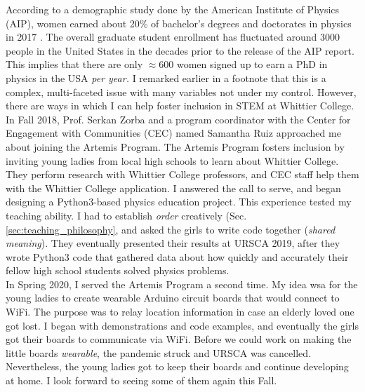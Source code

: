 \documentclass[../../../main.tex]{subfiles}
\begin{document}
According to a demographic study done by the American Institute of Physics (AIP), women earned about 20\% of bachelor's degrees and doctorates in physics in 2017 \cite{aip}.  The overall graduate student enrollment has fluctuated around 3000 people in the United States in the decades prior to the release of the AIP report.  This implies that there are only $\approx 600$ women signed up to earn a PhD in physics in the USA \textit{per year.}  I remarked earlier in a footnote that this is a complex, multi-faceted issue with many variables not under my control.  However, there are ways in which I can help foster inclusion in STEM at Whittier College.
\\
\vspace{0.25cm}
In Fall 2018, Prof. Serkan Zorba and a program coordinator with the Center for Engagement with Communities (CEC) named Samantha Ruiz approached me about joining the Artemis Program.  The Artemis Program fosters inclusion by inviting young ladies from local high schools to learn about Whittier College.  They perform research with Whittier College professors, and CEC staff help them with the Whittier College application.  I answered the call to serve, and began designing a Python3-based physics education project.  This experience tested my teaching ability.  I had to establish \textit{order} creatively (Sec. \ref{sec:teaching_philosophy}, and asked the girls to write code together (\textit{shared meaning}).  They eventually presented their results at URSCA 2019, after they wrote Python3 code that gathered data about how quickly and accurately their fellow high school students solved physics problems.
\\
\vspace{0.25cm}
In Spring 2020, I served the Artemis Program a second time.  My idea wsa for the young ladies to create wearable Arduino circuit boards that would connect to WiFi.  The purpose was to relay location information in case an elderly loved one got lost.  I began with demonstrations and code examples, and eventually the girls got their boards to communicate via WiFi.  Before we could work on making the little boards \textit{wearable}, the pandemic struck and URSCA was cancelled.  Nevertheless, the young ladies got to keep their boards and continue developing at home.  I look forward to seeing some of them again this Fall.
\end{document}
